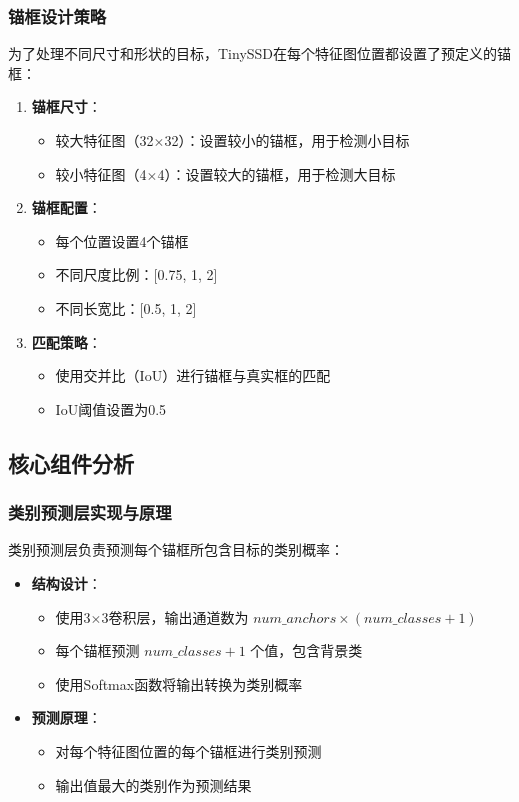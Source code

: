 \documentclass[UTF8]{ctexart}
\begin{document}
\subsubsection{锚框设计策略}
为了处理不同尺寸和形状的目标，TinySSD在每个特征图位置都设置了预定义的锚框：

\begin{enumerate}
    \item \textbf{锚框尺寸}：
    \begin{itemize}
        \item 较大特征图（32$\times$32）：设置较小的锚框，用于检测小目标
        \item 较小特征图（4$\times$4）：设置较大的锚框，用于检测大目标
    \end{itemize}
    
    \item \textbf{锚框配置}：
    \begin{itemize}
        \item 每个位置设置4个锚框
        \item 不同尺度比例：[0.75, 1, 2]
        \item 不同长宽比：[0.5, 1, 2]
    \end{itemize}
    
    \item \textbf{匹配策略}：
    \begin{itemize}
        \item 使用交并比（IoU）进行锚框与真实框的匹配
        \item IoU阈值设置为0.5
    \end{itemize}
\end{enumerate}
\subsection{核心组件分析}

\subsubsection{类别预测层实现与原理}
类别预测层负责预测每个锚框所包含目标的类别概率：
\begin{itemize}
    \item \textbf{结构设计}：
    \begin{itemize}
        \item 使用3$\times$3卷积层，输出通道数为 $num\_anchors \times (num\_classes + 1)$
        \item 每个锚框预测 $num\_classes + 1$ 个值，包含背景类
        \item 使用Softmax函数将输出转换为类别概率
    \end{itemize}
    \item \textbf{预测原理}：
    \begin{itemize}
        \item 对每个特征图位置的每个锚框进行类别预测
        \item 输出值最大的类别作为预测结果
    \end{itemize}
\end{itemize}
\end{document}
